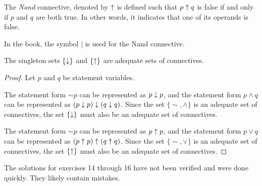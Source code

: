 The \textit{Nand} connective, denoted by \(\uparrow\) is defined such that \(p \uparrow q\) is false if and only if \(p\) and \(q\) are both true. In other words, it indicates that one of its operands is false.

\note{} In the book, the symbol \(|\) is used for the Nand connective.

\setcounter{definition}{25}
\begin{proposition}
  The singleton sets \(\{\downarrow\}\) and \(\{\uparrow\}\) are adequate sets of connectives.

  \begin{proof}
    Let \(p\) and \(q\) be statement variables.

    The statement form \(\sim p\) can be represented as \(p \downarrow p\), and the statement form \(p \land q\) can be represented as \((p \downarrow p) \downarrow (q \downarrow q)\). Since the set \(\{\sim, \land\}\) is an adequate set of connectives, the set \(\{\downarrow\}\) must also be an adequate set of connectives.

    The statement form \(\sim p\) can be represented as \(p \uparrow p\), and the statement form \(p \lor q\) can be represented as \((p \uparrow p) \uparrow (q \uparrow q)\). Since the set \(\{\sim, \lor\}\) is an adequate set of connectives, the set \(\{\uparrow\}\) must also be an adequate set of connectives.
  \end{proof}
\end{proposition}

\solutions{}

\note{} The solutions for exercises 14 through 16 have not been verified and were done quickly. They likely contain mistakes.

